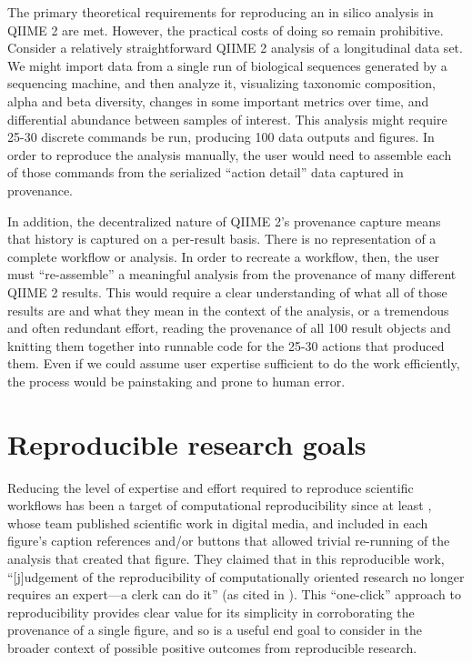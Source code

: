 The primary theoretical requirements for reproducing an in silico analysis in
QIIME 2 are met. However, the practical costs of doing so remain prohibitive.
Consider a relatively straightforward QIIME 2 analysis of a longitudinal data
set. We might import data from a single run of biological sequences generated by
a sequencing machine, and then analyze it, visualizing taxonomic composition,
alpha and beta diversity, changes in some important metrics over time, and
differential abundance between samples of interest. This analysis might require
25-30 discrete commands be run, producing 100 data outputs and figures. In order
to reproduce the analysis manually, the user would need to assemble each of
those commands from the serialized “action detail” data captured in provenance. 

In addition, the decentralized nature of QIIME 2’s provenance capture means that
history is captured on a per-result basis. There is no representation of a
complete workflow or analysis. In order to recreate a workflow, then, the user
must “re-assemble” a meaningful analysis from the provenance of many different
QIIME 2 results. This would require a clear understanding of what all of those
results are and what they mean in the context of the analysis, or a tremendous
and often redundant effort, reading the provenance of all 100 result objects and
knitting them together into runnable code for the 25-30 actions that produced
them. Even if we could assume user expertise sufficient to do the work
efficiently, the process would be painstaking and prone to human error. 


\section{Reproducible research goals}
\label{section:repro_goals}

Reducing the level of expertise and effort required to reproduce scientific
workflows has been a target of computational reproducibility since at least \textcite{claerbout_electronic_1992},
whose team published scientific work in digital media, and included in each figure’s
caption references and/or buttons that allowed trivial re-running of the
analysis that created that figure. They claimed that in this reproducible work,
“[j]udgement of the reproducibility of computationally oriented research no
longer requires an expert—a clerk can do it” (as cited in \cite[76]{plesser_reproducibility_2018}).
This “one-click” approach to reproducibility provides clear value for its
simplicity in corroborating the provenance of a single figure, and so is a
useful end goal to consider in the broader context of possible positive outcomes
from reproducible research.

